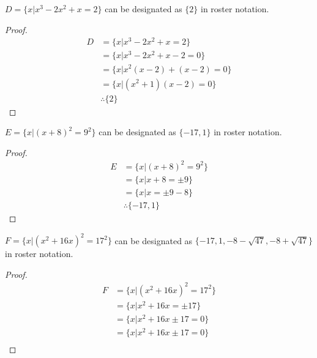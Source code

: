 \begin{question}
  \begin{subquestion}
    $D = \{x | x^3 - 2x^2 + x = 2\}$ can be designated as $\{2\}$ in roster notation.
  \end{subquestion}
  \begin{proof}
    \begin{equation}
      \begin{split}
        D & = \{x | x^3 - 2x^2 + x = 2\} \\
        & = \{x | x^3 - 2x^2 + x - 2 = 0 \} \\
        & = \{x | x^2(x - 2) + (x - 2) = 0 \} \\
        & = \{x | (x^2 + 1)(x - 2) = 0 \} \\
        & \therefore \{2\}
      \end{split}
    \end{equation}
  \end{proof}

  \begin{subquestion}
    $E = \{x | (x + 8)^2 = 9^2 \}$ can be designated as $\{-17, 1\}$ in roster notation.
  \end{subquestion}
  \begin{proof}
    \begin{equation}
      \begin{split}
        E & = \{x | (x + 8)^2 = 9^2 \} \\
        & = \{x | x + 8 = \pm{9} \} \\
        & = \{x | x = \pm{9} - 8 \} \\
        & \therefore \{-17, 1\}
      \end{split}
    \end{equation}
  \end{proof}

  \begin{subquestion}
    $F = \{x | (x^2 + 16x)^2 = 17^2 \}$ can be designated as $\{-17, 1, -8 - \sqrt{47}, -8 + \sqrt{47}\}$ in roster notation.
  \end{subquestion}
  \begin{proof}
    \begin{equation}
      \label{eq:some_nontrivial_root}
      \begin{split}
        F & = \{x | (x^2 + 16x)^2 = 17^2 \} \\
        & = \{x | x^2 + 16x = \pm{17} \} \\
        & = \{x | x^2 + 16x \pm{17} = 0 \} \\
        & = \{x | x^2 + 16x \pm{17} = 0 \} \\
      \end{split}
    \end{equation}
    

\end{proof}
\end{question}
